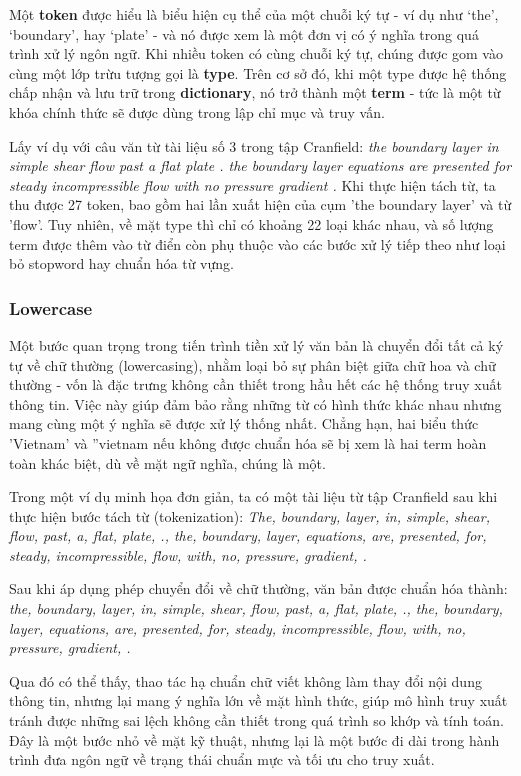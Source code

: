 Một \textbf{token} được hiểu là biểu hiện cụ thể của một chuỗi ký tự - ví dụ như `the', `boundary', hay `plate' - và nó được xem là một đơn vị có ý nghĩa trong quá trình xử lý ngôn ngữ. Khi nhiều token có cùng chuỗi ký tự, chúng được gom vào cùng một lớp trừu tượng gọi là \textbf{type}. Trên cơ sở đó, khi một type được hệ thống chấp nhận và lưu trữ trong \textbf{dictionary}, nó trở thành một \textbf{term} - tức là một từ khóa chính thức sẽ được dùng trong lập chỉ mục và truy vấn.

Lấy ví dụ với câu văn từ tài liệu số 3 trong tập Cranfield:
\textit{the boundary layer in simple shear flow past a flat plate . the boundary layer equations are presented for steady incompressible flow with no pressure gradient .}
Khi thực hiện tách từ, ta thu được 27 token, bao gồm hai lần xuất hiện của cụm 'the boundary layer' và từ 'flow'. Tuy nhiên, về mặt type thì chỉ có khoảng 22 loại khác nhau, và số lượng term được thêm vào từ điển còn phụ thuộc vào các bước xử lý tiếp theo như loại bỏ stopword hay chuẩn hóa từ vựng.

\subsubsection{Lowercase}
Một bước quan trọng trong tiến trình tiền xử lý văn bản là chuyển đổi tất cả ký tự về chữ thường (lowercasing), nhằm loại bỏ sự phân biệt giữa chữ hoa và chữ thường - vốn là đặc trưng không cần thiết trong hầu hết các hệ thống truy xuất thông tin. Việc này giúp đảm bảo rằng những từ có hình thức khác nhau nhưng mang cùng một ý nghĩa sẽ được xử lý thống nhất. Chẳng hạn, hai biểu thức 'Vietnam' và ''vietnam nếu không được chuẩn hóa sẽ bị xem là hai term hoàn toàn khác biệt, dù về mặt ngữ nghĩa, chúng là một.

Trong một ví dụ minh họa đơn giản, ta có một tài liệu từ tập Cranfield sau khi thực hiện bước tách từ (tokenization):
\textit{The, boundary, layer, in, simple, shear, flow, past, a, flat, plate, ., the, boundary, layer, equations, are, presented, for, steady, incompressible, flow, with, no, pressure, gradient, .}

Sau khi áp dụng phép chuyển đổi về chữ thường, văn bản được chuẩn hóa thành:
\textit{the, boundary, layer, in, simple, shear, flow, past, a, flat, plate, ., the, boundary, layer, equations, are, presented, for, steady, incompressible, flow, with, no, pressure, gradient, .}

Qua đó có thể thấy, thao tác hạ chuẩn chữ viết không làm thay đổi nội dung thông tin, nhưng lại mang ý nghĩa lớn về mặt hình thức, giúp mô hình truy xuất tránh được những sai lệch không cần thiết trong quá trình so khớp và tính toán. Đây là một bước nhỏ về mặt kỹ thuật, nhưng lại là một bước đi dài trong hành trình đưa ngôn ngữ về trạng thái chuẩn mực và tối ưu cho truy xuất.

